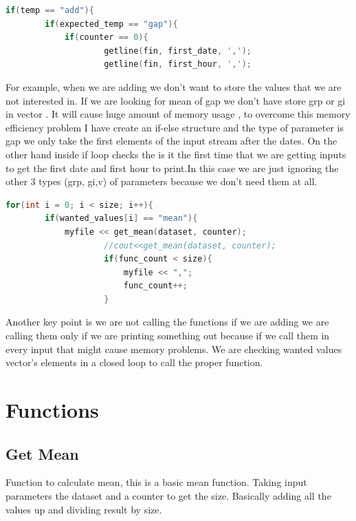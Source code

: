 \documentclass[a4paper, 12pt, titlepage]{article}
\begin{document}
\usepackage{\textbf{Adding}}
\begin{lstlisting}[language=C++]
    if(temp == "add"){
        if(expected_temp == "gap"){
            if(counter == 0){
                    getline(fin, first_date, ',');
                    getline(fin, first_hour, ',');
\end{lstlisting}

    For example, when we are adding we don't want to store the values that we are not interested in. If we are looking for mean of gap we don't have store grp or gi in vector . It will cause huge amount of memory usage , to overcome this memory efficiency problem I have create an if-else structure and the type of parameter is gap we only take the first elements of the input stream after the dates. On the other hand inside if loop checks the is it the first time that we are getting inputs to get the first date and first hour to print.In this case we are just ignoring the other 3 types (grp, gi,v) of parameters because we don't need them at all.



\usepackage{\textbf{Printing}}
\begin{lstlisting}[language=C++]
    for(int i = 0; i < size; i++){
        if(wanted_values[i] == "mean"){
            myfile << get_mean(dataset, counter);
                    //cout<<get_mean(dataset, counter);
                    if(func_count < size){
                        myfile << ",";
                        func_count++;
                    }
\end{lstlisting}

    Another key point is we are not calling the functions if we are adding we are calling them only if we are printing something out because if we call them in every input that might cause memory problems. We are checking wanted values vector's elements in a closed loop to call the proper function.

\newpage
\section{Functions}

\subsection{Get Mean}
    Function to calculate mean, this is a basic mean function. Taking input parameters the dataset and a counter to get the size. Basically adding all the values up and dividing result by size.
\end{document}
